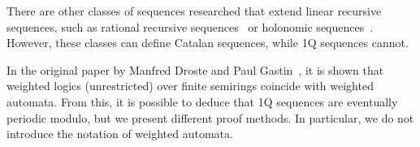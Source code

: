 \documentclass[12pt]{article}
\theoremstyle{definition}
\begin{document}
There are other classes of sequences researched that extend linear recursive sequences, such as rational recursive sequences~\cite{ClementeDMP23} or holonomic sequences~\cite{KenisonKLLMOW021}. However, these classes can define Catalan sequences, while 1Q sequences cannot.

In the original paper by Manfred Droste and Paul Gastin~\cite{DrosteG07}, it is shown that weighted logics (unrestricted) over finite semirings coincide with weighted automata. From this, it is possible to deduce that 1Q sequences are eventually periodic modulo, but we present different proof methods. In particular, we do not introduce the notation of weighted automata.







\end{document}
